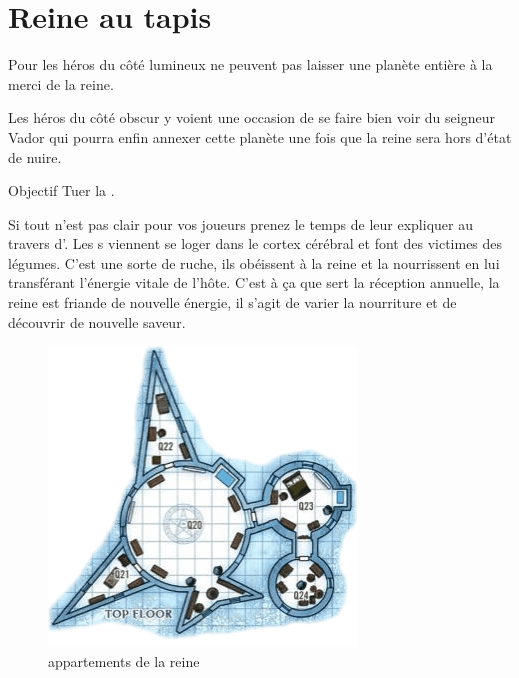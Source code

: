 \section{Reine au tapis}

\lettrine{\jedifont{\$}} Pour les héros du côté lumineux ne peuvent pas laisser une planète entière à la merci de la reine.

\lettrine{\jedifont{\#}} Les héros du côté obscur y voient une occasion de se faire bien voir du seigneur Vador qui pourra enfin annexer cette planète une fois que la reine sera hors d’état de nuire.

\begin{paperbox}{Objectif}
Tuer la .
\end{paperbox}

Si tout n’est pas clair pour vos joueurs prenez le temps de leur expliquer au travers d’. Les s viennent se loger dans le cortex cérébral et font des victimes des légumes. C’est une sorte de ruche, ils obéissent à la reine et la nourrissent en lui transférant l’énergie vitale de l’hôte. C’est à ça que sert la réception annuelle, la reine est friande de nouvelle énergie, il s’agit de varier la nourriture et de découvrir de nouvelle saveur.

\begin{figure}[h]
\noindent\includegraphics[width=\linewidth]{_img/places/queen-quarter.png}
\caption{appartements de la reine\label{fig:queen-quarter}}
\end{figure}

